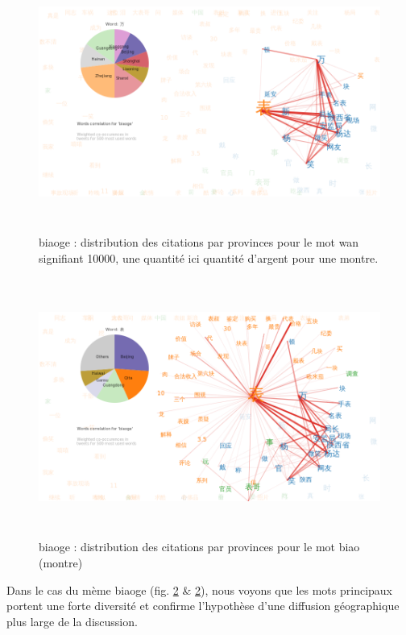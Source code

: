 \begin{figure}[h!]
    \centering
    \includegraphics[width=6.0087in,height=3.3386in]{figures/chap4/chapitre4-img59.png}
    \caption{
      biaoge : distribution des citations par provinces pour le mot wan signifiant 10000, une quantit\'e ici quantit\'e d{\textquoteright}argent pour une montre.
    }
    \label{fig:biaoge-words-pie-wan}
\end{figure}
 



\begin{figure}[h!]
  \centering
  \includegraphics[width=6.0087in,height=3.3386in]{figures/chap4/chapitre4-img60.png}
  \caption{
     biaoge : distribution des citations par provinces pour le mot biao (montre)
  }
  \label{fig:biaoge-words-pie-biao}
\end{figure}


Dans le cas du m\`eme biaoge (fig. \ref{fig:biaoge-words-pie-biao} \& \ref{fig:biaoge-words-pie-biao}), nous voyons que les mots principaux
portent une forte diversit\'e et confirme l{\textquoteright}hypoth\`ese
d{\textquoteright}une diffusion g\'eographique plus large de la
discussion.


